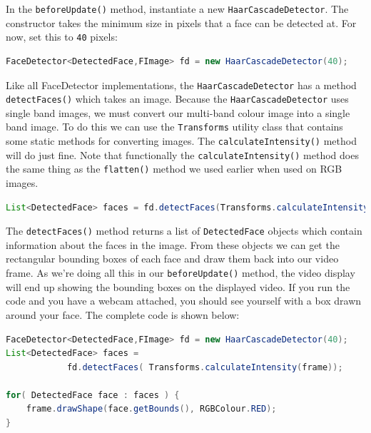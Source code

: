 \documentclass[10pt,a4paper,twoside,extrafontsizes]{memoir}
\begin{document}
In the \verb+beforeUpdate()+ method, instantiate a new \verb+HaarCascadeDetector+. The constructor takes 
the minimum size in pixels that a face can be detected at. For now, set this to \verb+40+ pixels:
\begin{lstlisting}[language=java]
FaceDetector<DetectedFace,FImage> fd = new HaarCascadeDetector(40);
\end{lstlisting}

Like all FaceDetector implementations, the \verb+HaarCascadeDetector+ has a method \verb+detectFaces()+
which takes an image. Because the \verb+HaarCascadeDetector+ uses single band images, we must convert 
our multi-band colour image into a single band image. To do this we can use the \verb+Transforms+ utility 
class that contains some static methods for converting images. The \verb+calculateIntensity()+ method 
will do just fine. Note that functionally the \verb+calculateIntensity()+ method does the same thing 
as the \verb+flatten()+ method we used earlier when used on RGB images.
\begin{lstlisting}[language=java]
List<DetectedFace> faces = fd.detectFaces(Transforms.calculateIntensity(frame));
\end{lstlisting}
The \verb+detectFaces()+ method returns a list of \verb+DetectedFace+ objects which contain 
information about the faces in the image. From these objects we can get the rectangular 
bounding boxes of each face and draw them back into our video frame. As we're doing all 
this in our \verb+beforeUpdate()+ method, the video display will end up showing the 
bounding boxes on the displayed video. If you run the code and you have a webcam attached,
you should see yourself with a box drawn around your face. The complete code is shown below:
\begin{lstlisting}[language=java]
FaceDetector<DetectedFace,FImage> fd = new HaarCascadeDetector(40);
List<DetectedFace> faces =
            fd.detectFaces( Transforms.calculateIntensity(frame));

for( DetectedFace face : faces ) {
    frame.drawShape(face.getBounds(), RGBColour.RED);
}
\end{lstlisting}
\end{document}
